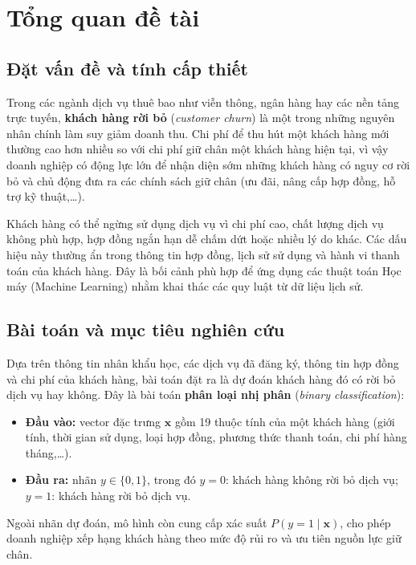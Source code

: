 \section{Tổng quan đề tài}

\subsection{Đặt vấn đề và tính cấp thiết}
Trong các ngành dịch vụ thuê bao như viễn thông, ngân hàng hay các nền tảng trực tuyến, \textbf{khách hàng rời bỏ} (\textit{customer churn}) là một trong những nguyên nhân chính làm suy giảm doanh thu. Chi phí để thu hút một khách hàng mới thường cao hơn nhiều so với chi phí giữ chân một khách hàng hiện tại, vì vậy doanh nghiệp có động lực lớn để nhận diện sớm những khách hàng có nguy cơ rời bỏ và chủ động đưa ra các chính sách giữ chân (ưu đãi, nâng cấp hợp đồng, hỗ trợ kỹ thuật,\ldots).

Khách hàng có thể ngừng sử dụng dịch vụ vì chi phí cao, chất lượng dịch vụ không phù hợp, hợp đồng ngắn hạn dễ chấm dứt hoặc nhiều lý do khác. Các dấu hiệu này thường ẩn trong thông tin hợp đồng, lịch sử sử dụng và hành vi thanh toán của khách hàng. Đây là bối cảnh phù hợp để ứng dụng các thuật toán Học máy (Machine Learning) nhằm khai thác các quy luật từ dữ liệu lịch sử.

\subsection{Bài toán và mục tiêu nghiên cứu}
Dựa trên thông tin nhân khẩu học, các dịch vụ đã đăng ký, thông tin hợp đồng và chi phí của khách hàng, bài toán đặt ra là dự đoán khách hàng đó có rời bỏ dịch vụ hay không. Đây là bài toán \textbf{phân loại nhị phân} (\textit{binary classification}):
\begin{itemize}
    \item \textbf{Đầu vào:} vector đặc trưng $\mathbf{x}$ gồm 19 thuộc tính của một khách hàng (giới tính, thời gian sử dụng, loại hợp đồng, phương thức thanh toán, chi phí hàng tháng,\ldots).
    \item \textbf{Đầu ra:} nhãn $y \in \{0, 1\}$, trong đó $y = 0$: khách hàng không rời bỏ dịch vụ; $y = 1$: khách hàng rời bỏ dịch vụ.
\end{itemize}
Ngoài nhãn dự đoán, mô hình còn cung cấp xác suất $P(y=1 \mid \mathbf{x})$, cho phép doanh nghiệp xếp hạng khách hàng theo mức độ rủi ro và ưu tiên nguồn lực giữ chân.

